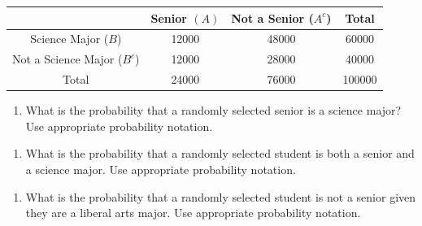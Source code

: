 \documentclass[
]{report}
\providecommand{\tightlist}{%
  \setlength{\itemsep}{0pt}\setlength{\parskip}{0pt}}
\begin{document}
\begin{center}
\begin{tabular}{|c|c|c|c|} \hline
\hspace{0.8in} & \hspace{0.25in} Senior $(A)$ \hspace{.25in} & \hspace{0.25in} Not a Senior ($A^c$) \hspace{0.25in} & \hspace{0.25in} Total \hspace{0.25in} \\ \hline
Science Major ($B$) & 12000 & 48000 & 60000 \\ \hline
Not a Science Major ($B^c$) & 12000 & 28000 & 40000 \\ \hline
Total & 24000 & 76000 & 100000 \\ \hline
\end{tabular}
\end{center}
\vspace{.1in}

\begin{enumerate}
\def\labelenumi{\alph{enumi}.}
\tightlist
\item
  What is the probability that a randomly selected senior is a science major? Use appropriate probability notation.
\end{enumerate}

\vspace{0.5in}

\begin{enumerate}
\def\labelenumi{\alph{enumi}.}
\setcounter{enumi}{1}
\tightlist
\item
  What is the probability that a randomly selected student is both a senior and a science major. Use appropriate probability notation.
\end{enumerate}

\vspace{0.5in}

\begin{enumerate}
\def\labelenumi{\alph{enumi}.}
\setcounter{enumi}{2}
\tightlist
\item
  What is the probability that a randomly selected student is not a senior given they are a liberal arts major. Use appropriate probability notation.
\end{enumerate}

\vspace{0.55in}

\newpage
\end{document}
